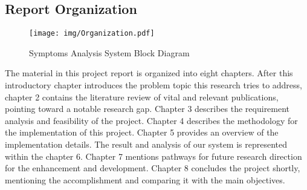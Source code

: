 
\newpage
\subsection{Report Organization}
\begin{figure}[H]
\centering
\texttt{[image: img/Organization.pdf]}
\caption[Symptoms Analysis System Block Diagram]{Symptoms Analysis System Block Diagram}
\label{fig:System block diagram}
\end{figure}

The material in this project report is organized into eight chapters. After this introductory chapter introduces the problem topic this research tries to address, chapter 2 contains the literature review of vital and relevant publications, pointing toward a notable research gap. Chapter 3 describes the requirement analysis and feasibility of the project. Chapter 4 describes the methodology for the implementation of this project. Chapter 5 provides an overview of the implementation details. The result and analysis of our system is represented within the chapter 6. Chapter 7 mentions pathways for future research direction for the enhancement and development. Chapter 8 concludes the project shortly, mentioning the accomplishment and comparing it with the main objectives.


